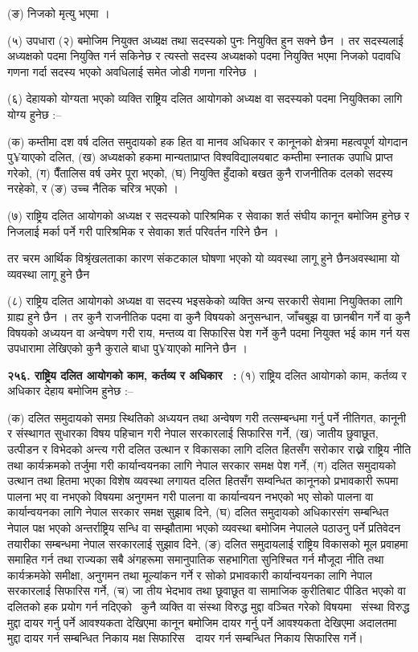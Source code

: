 (ङ) निजको मृत्यु भएमा ।

(५) उपधारा (२) बमोजिम नियुक्त अध्यक्ष तथा सदस्यको पुनः नियुक्ति हुन सक्ने छैन ।
तर सदस्यलाई अध्यक्षको पदमा नियुक्ति गर्न सकिनेछ र त्यस्तो सदस्य अध्यक्षको पदमा नियुक्ति भएमा निजको पदावधि गणना गर्दा सदस्य भएको अवधिलाई समेत जोडी गणना गरिनेछ ।

(६) देहायको योग्यता भएको व्यक्ति राष्ट्रिय दलित आयोगको अध्यक्ष वा सदस्यको पदमा नियुक्तिका लागि योग्य हुनेछ :–

(क) कम्तीमा दश वर्ष दलित समुदायको हक हित वा मानव अधिकार र कानूनको क्षेत्रमा महत्वपूर्ण योगदान पु¥याएको दलित,
(ख) अध्यक्षको हकमा मान्यताप्राप्त विश्वविद्यालयबाट कम्तीमा स्नातक उपाधि प्राप्त गरेको,
(ग) पैँतालिस वर्ष उमेर पूरा भएको,
(घ) नियुक्ति हुँदाको बखत कुनै राजनीतिक दलको सदस्य नरहेको, र
(ङ) उच्च नैतिक चरित्र भएको ।

(७) राष्ट्रिय दलित आयोगको अध्यक्ष र सदस्यको पारिश्रमिक र सेवाका शर्त संघीय कानून बमोजिम हुनेछ र निजलाई मर्का पर्ने गरी पारिश्रमिक र सेवाका शर्त परिवर्तन गरिने छैन ।

तर चरम आर्थिक विश्रृंखलताका कारण संकटकाल घोषणा भएको यो व्यवस्था लागू हुने छैनअवस्थामा यो व्यवस्था लागू हुने छैन

(८) राष्ट्रिय दलित आयोगको अध्यक्ष वा सदस्य भइसकेको व्यक्ति अन्य सरकारी सेवामा नियुक्तिका लागि ग्राह्य हुने छैन ।
तर कुनै राजनीतिक पदमा वा कुनै विषयको अनुसन्धान, जाँचबुझ वा छानबीन गर्ने वा कुनै विषयको अध्ययन वा अन्वेषण गरी राय, मन्तव्य वा सिफारिस पेश गर्ने कुनै पदमा नियुक्त भई काम गर्न यस उपधारामा लेखिएको कुनै कुराले बाधा पु¥याएको मानिने छैन ।

\textbf{२५६. राष्ट्रिय दलित आयोगको काम, कर्तव्य र अधिकार  :} (१) राष्ट्रिय दलित आयोगको काम, कर्तव्य र अधिकार देहाय बमोजिम हुनेछ :–

(क) दलित समुदायको समग्र स्थितिको अध्ययन तथा अन्वेषण गरी तत्सम्बन्धमा गर्नु पर्ने नीतिगत, कानूनी र संस्थागत सुधारका विषय पहिचान गरी नेपाल सरकारलाई सिफारिस गर्ने,
(ख) जातीय छुवाछूत, उत्पीडन र विभेदको अन्त्य गरी दलित उत्थान र विकासका लागि दलित हितसँग सरोकार राख्ने राष्ट्रिय नीति तथा कार्यक्रमको तर्जुमा गरी कार्यान्वयनका लागि नेपाल सरकार समक्ष पेश गर्ने,
(ग) दलित समुदायको उत्थान तथा हितमा भएका विशेष व्यवस्था लगायत दलित हितसँग सम्वन्धित कानूनको प्रभावकारी रूपमा पालना भए वा नभएको विषयमा अनुगमन गरी पालना वा कार्यान्वयन नभएको भए सोको पालना वा कार्यान्वयनका लागि नेपाल सरकार समक्ष सुझाब दिने,
(घ) दलित समुदायको अधिकारसंग सम्बन्धित नेपाल पक्ष भएको अन्तर्राष्ट्रिय सन्धि वा सम्झौतामा भएको व्यवस्था बमोजिम नेपालले पठाउनु पर्ने प्रतिवेदन तयारीका सम्बन्धमा नेपाल सरकारलाई सुझाव दिने,
(ङ) दलित समुदायलाई राष्ट्रिय विकासको मूल प्रवाहमा समाहित गर्न तथा राज्यका सबै अंगहरूमा समानुपातिक सहभागिता सुनिश्चित गर्न मौजूदा नीति तथा कार्यक्रमकोे समीक्षा, अनुगमन तथा मूल्यांकन गर्ने र सोको प्रभावकारी कार्यान्वयनका लागि नेपाल सरकारलाई सिफारिस गर्ने,
(च) जा तीय भेदभाव तथा छूवाछूत वा सामाजिक कुरीतिबाट पीडित भएको वा दलितको हक प्रयोग गर्न नदिएको  कुनै व्यक्ति वा संस्था विरुद्ध मुद्दा वञ्चित गरेको विषयमा  संस्था विरुद्ध मुद्दा दायर गर्नु पर्ने आवश्यकता देखिएमा कानून बमोजिम दायर गर्नु पर्ने आवश्यकता देखिएमा अदालतमा मुद्दा दायर गर्न सम्बन्धित निकाय मक्ष सिफारिस  दायर गर्न सम्बन्धित निकाय सिफारिस गर्ने।

